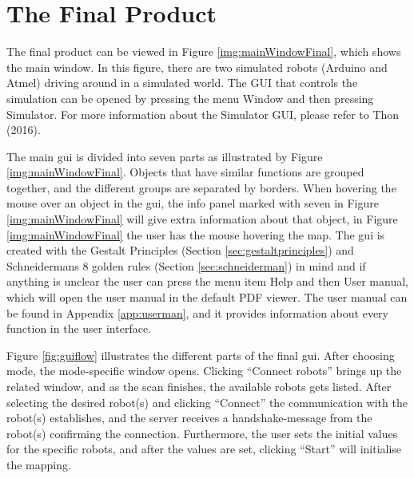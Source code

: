 \section{The Final Product}
The final product can be viewed in Figure \ref{img:mainWindowFinal}, which shows the main window. In this figure, there are two simulated robots (Arduino and Atmel) driving around in a simulated world. The GUI that controls the simulation can be opened by pressing the menu Window and then pressing Simulator. For more information about the Simulator GUI, please refer to Thon (2016).


The main \acrshort{gui} is divided into seven parts as illustrated by Figure \ref{img:mainWindowFinal}. Objects that have similar functions are grouped together, and the different groups are separated by borders. When hovering the mouse over an object in the \acrshort{gui}, the info panel marked with seven in Figure \ref{img:mainWindowFinal} will give extra information about that object, in Figure \ref{img:mainWindowFinal} the user has the mouse hovering the map. The \acrshort{gui} is created with the Gestalt Principles (Section \ref{sec:gestaltprinciples}) and Schneidermans 8 golden rules (Section \ref{sec:schneiderman}) in mind and if anything is unclear the user can press the menu item Help and then User manual, which will open the user manual in the default PDF viewer. The user manual can be found in Appendix \ref{app:userman}, and it provides information about every function in the user interface.

Figure \ref{fig:guiflow} illustrates the different parts of the final \acrshort{gui}. After choosing mode, the mode-specific window opens. Clicking ``Connect robots'' brings up the related window, and as the scan finishes, the available robots gets listed. After selecting the desired robot(s) and clicking ``Connect'' the communication with the robot(s) establishes, and the server receives a handshake-message from the robot(s) confirming the connection. Furthermore, the user sets the initial values for the specific robots, and after the values are set, clicking ``Start'' will initialise the mapping.

